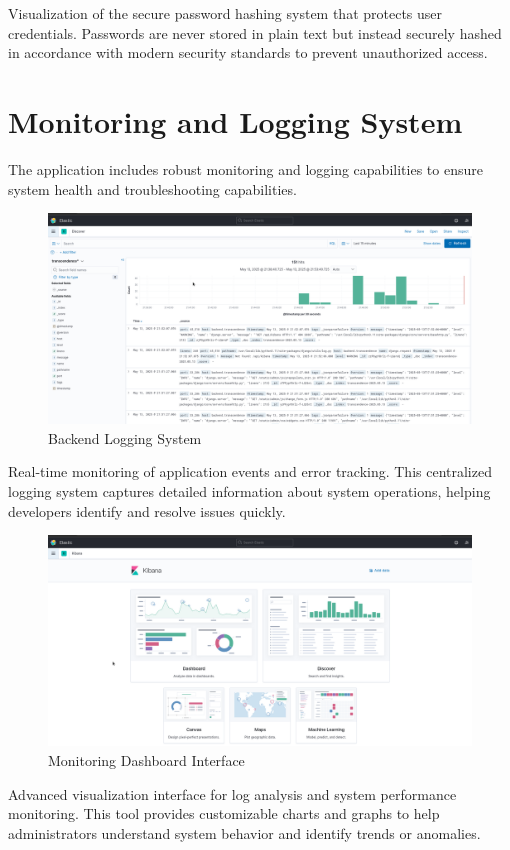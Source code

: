 \begin{appendices}
    \noindent Visualization of the secure password hashing system that protects user credentials. Passwords are never stored in plain text but instead securely hashed in accordance with modern security standards to prevent unauthorized access.

    \section{Monitoring and Logging System}
    The application includes robust monitoring and logging capabilities to ensure system health and troubleshooting capabilities.

    \begin{figure}[H]
        \centering
        \includegraphics[width=0.75\linewidth]{Figures/appendix/ElasticBackendLogs.png}
        \caption*{Backend Logging System}
        \label{fig:elastic-logs}
    \end{figure}
    
    \noindent Real-time monitoring of application events and error tracking. This centralized logging system captures detailed information about system operations, helping developers identify and resolve issues quickly.

    \begin{figure}[H]
        \centering
        \includegraphics[width=0.7\linewidth]{Figures/appendix/KibanaHome.png}
        \caption*{Monitoring Dashboard Interface}
        \label{fig:kibana-dashboard}
    \end{figure}
    
    \noindent Advanced visualization interface for log analysis and system performance monitoring. This tool provides customizable charts and graphs to help administrators understand system behavior and identify trends or anomalies.

\end{appendices}